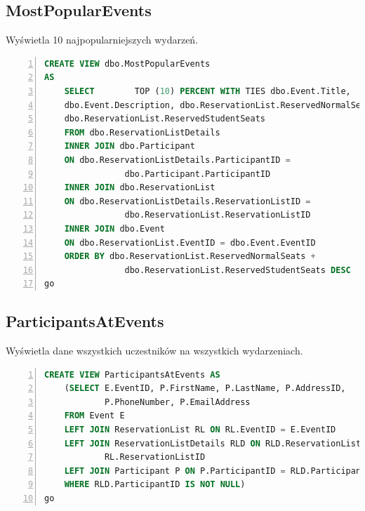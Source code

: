 \documentclass[]{article}
\begin{document}
	
	\subsection{MostPopularEvents}
	Wyświetla 10 najpopularniejszych wydarzeń.
	\begin{lstlisting}[language=SQL,
						showspaces=false,
						basicstyle=\ttfamily,
						numbers=left,
						numberstyle=\tiny,
						backgroundcolor=\color{lightg},
						keywordstyle=\color{lightblue},
						commentstyle=\color{gray}]
CREATE VIEW dbo.MostPopularEvents
AS
	SELECT        TOP (10) PERCENT WITH TIES dbo.Event.Title,
	dbo.Event.Description, dbo.ReservationList.ReservedNormalSeats,
	dbo.ReservationList.ReservedStudentSeats
	FROM dbo.ReservationListDetails
	INNER JOIN dbo.Participant
	ON dbo.ReservationListDetails.ParticipantID = 
				dbo.Participant.ParticipantID
	INNER JOIN dbo.ReservationList
	ON dbo.ReservationListDetails.ReservationListID =
				dbo.ReservationList.ReservationListID
	INNER JOIN dbo.Event
	ON dbo.ReservationList.EventID = dbo.Event.EventID
	ORDER BY dbo.ReservationList.ReservedNormalSeats +
				dbo.ReservationList.ReservedStudentSeats DESC
go
	\end{lstlisting}

	\subsection{ParticipantsAtEvents}
	Wyświetla dane wszystkich uczestników na wszystkich wydarzeniach.
	\begin{lstlisting}[language=SQL,
						showspaces=false,
						basicstyle=\ttfamily,
						numbers=left,
						numberstyle=\tiny,
						backgroundcolor=\color{lightg},
						keywordstyle=\color{lightblue},
						commentstyle=\color{gray}]
CREATE VIEW ParticipantsAtEvents AS
	(SELECT E.EventID, P.FirstName, P.LastName, P.AddressID,
			P.PhoneNumber, P.EmailAddress
	FROM Event E
	LEFT JOIN ReservationList RL ON RL.EventID = E.EventID
	LEFT JOIN ReservationListDetails RLD ON RLD.ReservationListID =
			RL.ReservationListID
	LEFT JOIN Participant P ON P.ParticipantID = RLD.ParticipantID
	WHERE RLD.ParticipantID IS NOT NULL)
go
	\end{lstlisting}
\end{document}

